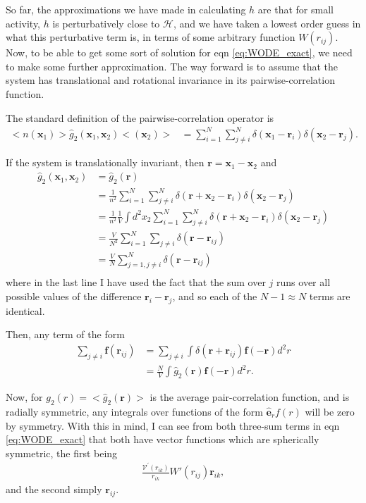 \documentclass{article}
\begin{document}
So far, the approximations we have made in calculating $h$ are that for small activity,
$h$ is perturbatively close to $\mathcal{H}$, and we have taken a lowest order guess in
what this perturbative term is, in terms of some arbitrary function $W(r_{ij})$. Now, to
be able to get some sort of solution for eqn \ref{eq:WODE_exact}, we need to make some
further approximation. The way forward is to assume that the system has translational and
rotational invariance in its pairwise-correlation function.

The standard definition of the pairwise-correlation operator is
\begin{align}
  <n(\bm{x}_1)>\hat{g}_2(\bm{x}_1,\bm{x}_2)<(\bm{x}_2)>
  &=\sum_{i=1}^N\sum_{j\neq i}^N\delta(\bm{x}_1-\bm{r}_i)
    \delta(\bm{x}_2-\bm{r}_j).
\end{align}

If the system is translationally invariant, then $\bm{r}=\bm{x}_1-\bm{x}_2$ and
\begin{align}
  \hat{g}_2(\bm{x}_1,\bm{x}_2)
  &=\hat{g}_2(\bm{r})\nonumber\\
  &=\frac{1}{n^2}\sum_{i=1}^N\sum_{j\neq i}^N\delta(\bm{r}+\bm{x}_2-\bm{r}_i)
    \delta(\bm{x}_2-\bm{r}_j)\nonumber\\
  &=\frac{1}{n^2}\frac{1}{V}\int d^2x_2 \sum_{i=1}^N\sum_{j\neq i}^N
    \delta(\bm{r}+\bm{x}_2-\bm{r}_i)\delta(\bm{x}_2-\bm{r}_j)\nonumber\\
  &=\frac{V}{N^2}\sum_{i=1}^N\sum_{j\neq i}\delta(\bm{r}-\bm{r}_{ij})\nonumber\\
  &=\frac{V}{N}\sum_{j=1,j\neq i}^N\delta(\bm{r}-\bm{r}_{ij})\nonumber\\
\end{align}
where in the last line I have used the fact that the sum over $j$ runs over all possible
values of the difference $\bm{r}_i-\bm{r}_j$, and so each of the $N-1\approx N$ terms are
identical.

Then, any term of the form
\begin{align}
  \sum_{j\neq i} \bm{f}(\bm{r}_{ij})
  &= \sum_{j\neq i}\int \delta(\bm{r}+\bm{r}_{ij})\bm{f}(-\bm{r}) d^2r\nonumber\\
  &=\frac{N}{V}\int\hat{g}_2(\bm{r})\bm{f}(-\bm{r})d^2r.
\end{align}

Now, for $g_2(r)=<\hat{g}_2(\bm{r})>$ is the average pair-correlation function, and is
radially symmetric, any integrals over functions of the form $\bm{\hat{e}}_r f(r)$ will
be zero by symmetry. With this in mind, I can see from both three-sum terms in eqn
\ref{eq:WODE_exact} that both have vector functions which are spherically symmetric, the
first being 
\begin{align}
  \frac{\mathcal{V}^{\prime}(r_{ik})}{r_{ik}}W'(r_{ij})\bm{r}_{ik},
\end{align}
and the second simply $\bm{r}_{ij}$. 
\end{document}
